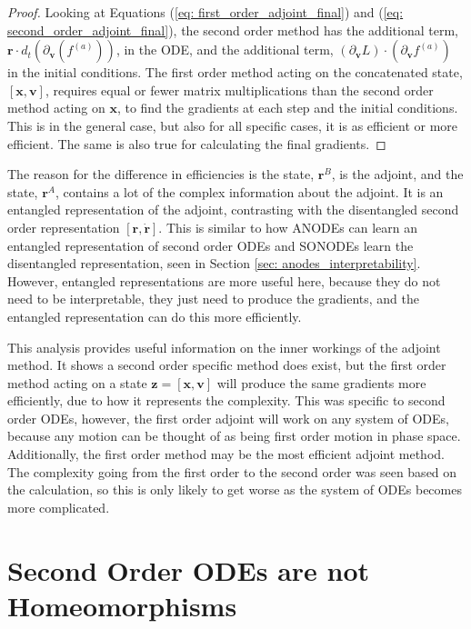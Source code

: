 \documentclass{article}
\theoremstyle{remark}
\theoremstyle{definition}
\begin{document}
\begin{proof}
Looking at Equations (\ref{eq: first_order_adjoint_final}) and (\ref{eq: second_order_adjoint_final}), the second order method has the additional term, $\mathbf{r}\cdot d_{t}(\partial_{\mathbf{v}}(f^{(a)}))$, in the ODE, and the additional term, $(\partial_{\mathbf{v}}L)\cdot (\partial_{\mathbf{v}}f^{(a)})$ in the initial conditions. The first order method acting on the concatenated state, $[\mathbf{x}, \mathbf{v}]$, requires equal or fewer matrix multiplications than the second order method acting on $\mathbf{x}$, to find the gradients at each step and the initial conditions. This is in the general case, but also for all specific cases, it is as efficient or more efficient. The same is also true for calculating the final gradients. 
\end{proof}

The reason for the difference in efficiencies is the state, $\mathbf{r}^{B}$, is the adjoint, and the state, $\mathbf{r}^{A}$, contains a lot of the complex information about the adjoint. It is an entangled representation of the adjoint, contrasting with the disentangled second order representation $[\mathbf{r}, \dot{\mathbf{r}}]$. This is similar to how ANODEs can learn an entangled representation of second order ODEs and SONODEs learn the disentangled representation, seen in Section \ref{sec: anodes_interpretability}. However, entangled representations are more useful here, because they do not need to be interpretable, they just need to produce the gradients, and the entangled representation can do this more efficiently.

This analysis provides useful information on the inner workings of the adjoint method. It shows a second order specific method does exist, but the first order method acting on a state $\mathbf{z}=[\mathbf{x},\mathbf{v}]$ will produce the same gradients more efficiently, due to how it represents the complexity. This was specific to second order ODEs, however, the first order adjoint will work on any system of ODEs, because any motion can be thought of as being first order motion in phase space. Additionally, the first order method may be the most efficient adjoint method. The complexity going from the first order to the second order was seen based on the calculation, so this is only likely to get worse as the system of ODEs becomes more complicated.

\section{Second Order ODEs are not Homeomorphisms}
\label{app: sonode_not_homeomorphism}
\end{document}
